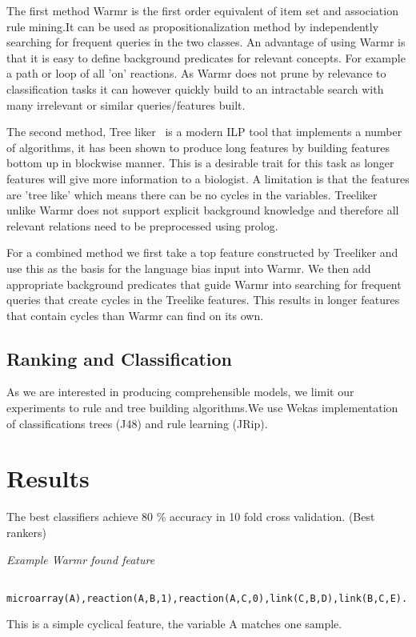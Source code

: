 \documentclass[runningheads,a4paper]{llncs}
\begin{document}
The first method Warmr \citep{dehaspe_mining_1997} is the first order equivalent of item set and association rule mining.It can be used as propositionalization method by independently searching for frequent queries in the two classes. An advantage of using Warmr is that it is easy to define background predicates for relevant concepts. For example a path or loop of all 'on' reactions. As Warmr does not prune by relevance to classification tasks it can however quickly build to an intractable search with many irrelevant or similar queries/features built. 
	     

The second method, Tree liker~\citep{vzelezny2013fast} is a modern ILP tool that implements a number of algorithms, it has been shown to produce long features by building features bottom up in blockwise manner. This is a desirable trait for  this task as longer features will give more information to a biologist. A limitation is that the features are 'tree like' which means there can be no cycles in the variables. Treeliker unlike Warmr does not support explicit background knowledge and therefore all relevant relations need to be preprocessed using prolog.

For a combined method we first take a top feature constructed by Treeliker and use this as the basis for the language bias input into Warmr. We then add appropriate background predicates that guide Warmr into searching for frequent queries that create cycles in the Treelike features. This results in longer features that contain cycles than Warmr can find on its own. 
	     
\subsection{Ranking and Classification}
As we are interested in producing comprehensible models, we limit our experiments to rule and tree building algorithms.We use Wekas implementation of classifications trees (J48) and rule learning (JRip). 
	     
\section{Results}
The best classifiers achieve 80 \% accuracy in 10 fold cross validation.
(Best rankers)
\newline

\noindent
{\it{Example Warmr found feature}}

\begin{verbatim}
  microarray(A),reaction(A,B,1),reaction(A,C,0),link(C,B,D),link(B,C,E).
\end{verbatim}
\noindent 
This is a simple cyclical feature, the variable A matches one sample. 
\newline
\end{document}
